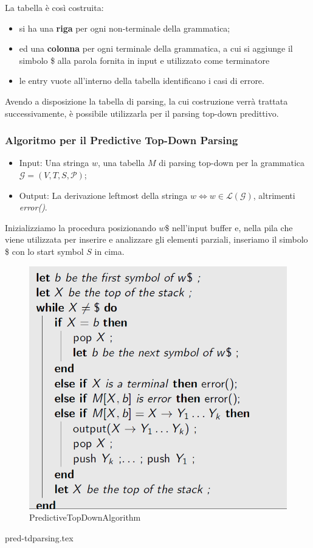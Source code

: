 \documentclass[class=book, crop=false, oneside, 12pt]{standalone}
\begin{document}
La tabella è così costruita:
\begin{itemize}
    \item si ha una \textbf{riga} per ogni non-terminale della grammatica;
    \item ed una \textbf{colonna} per ogni terminale della grammatica, a cui si aggiunge il simbolo \$ alla parola fornita in input e utilizzato come terminatore
    \item le entry vuote all'interno della tabella identificano i casi di errore.
\end{itemize}

Avendo a disposizione la tabella di parsing, la cui costruzione verrà trattata successivamente, è possibile utilizzarla per il parsing top-down predittivo.

\subsubsection{Algoritmo per il Predictive Top-Down Parsing}
\begin{itemize}
    \item Input: Una stringa \(w\), una tabella \(M\) di parsing top-down per la grammatica \(\mathcal{G} = (V, T, S, \mathcal{P})\);
    \item Output: La derivazione leftmost della stringa \(w \iff w \in \mathcal{L(G)}\), altrimenti \emph{error()}.
\end{itemize}
Inizializziamo la procedura posizionando \(w\$\) nell'input buffer e, nella pila che viene utilizzata per inserire e analizzare gli elementi parziali, inseriamo il simbolo \$ con lo start symbol \(S\) in cima.
\begin{figure}[H]
    \centering
    \includegraphics[width=.7\textwidth,keepaspectratio]{PredictiveTopDownAlgorithm.png}
    \caption{PredictiveTopDownAlgorithm}
    \label{PredictiveTopDownAlgorithm}
\end{figure}
{pred-tdparsing.tex}
\end{document}
